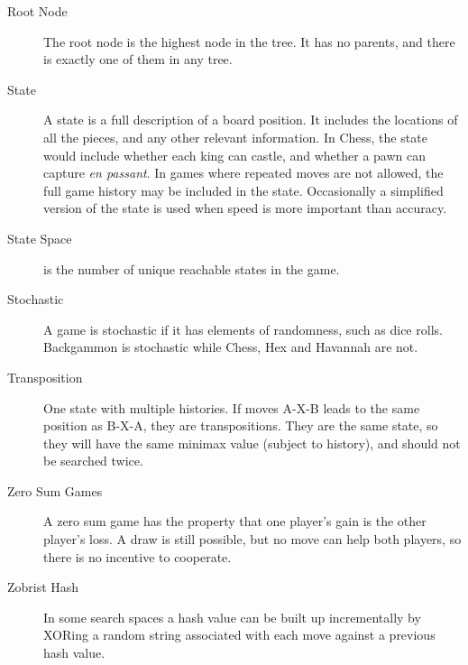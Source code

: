 \begin{description}
\item[Root Node] The root node is the highest node in the tree. It has no parents, and there is exactly one of them in any tree.
\item[State] A state is a full description of a board position. It includes the locations of all the pieces, and any other relevant information. In Chess, the state would include whether each king can castle, and whether a pawn can capture \textit{en passant}. In games where repeated moves are not allowed, the full game history may be included in the state. Occasionally a simplified version of the state is used when speed is more important than accuracy.
\item[State Space] is the number of unique reachable states in the game.
\item[Stochastic] A game is stochastic if it has elements of randomness, such as dice rolls. Backgammon is stochastic while Chess, Hex and Havannah are not.
\item[Transposition] One state with multiple histories. If moves A-X-B leads to the same position as B-X-A, they are transpositions. They are the same state, so they will have the same minimax value (subject to history), and should not be searched twice.
\item[Zero Sum Games] A zero sum game has the property that one player's gain is the other player's loss. A draw is still possible, but no move can help both players, so there is no incentive to cooperate.
\item[Zobrist Hash] In some search spaces a hash value can be built up incrementally by XORing a random string associated with each move against a previous hash value.

\end{description}

